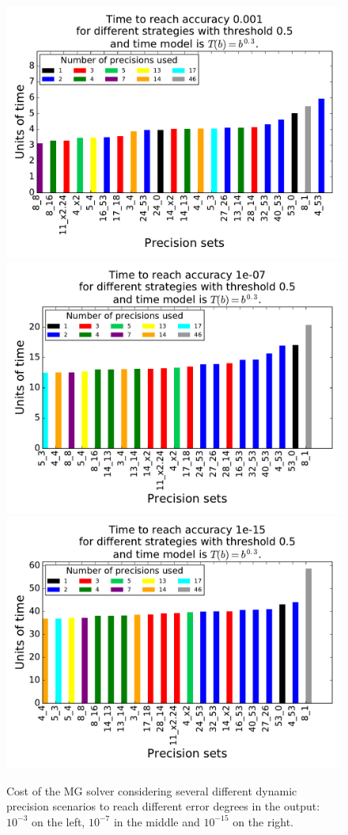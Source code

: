 \begin{figure}
    \includegraphics[width=0.33\linewidth]{figs/cost_3.pdf}
    \includegraphics[width=0.33\linewidth]{figs/cost_7.pdf}
    \includegraphics[width=0.33\linewidth]{figs/cost_15.pdf}
    \caption{Cost of the MG solver considering several different dynamic
    precision scenarios to reach different error degrees in the output:
    $10^{-3}$ on the left, $10^{-7}$ in the middle and $10^{-15}$ on the
    right.}
    \label{fig.estimation1}
\end{figure}


